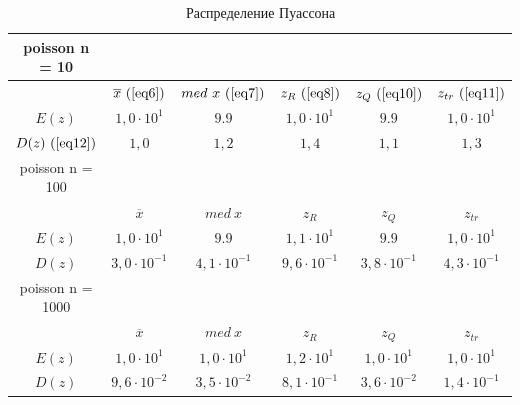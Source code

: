 \begin{table}[H]
    \centering
    \begin{tabular}{ |c|c|c|c|c|c| } 
 \hline
 poisson n = 10 & & & & & \\ 
 \hline
  &$\overline{x}\ (\ref{eq6})$ & $med\ x\ (\ref{eq7})$ & $z_{R}\ (\ref{eq8})$ & $z_{Q}\ (\ref{eq10})$ & $z_{tr}\ (\ref{eq11})$\\ 
 \hline
 $E(z)$ & $1,0 \cdot 10^{1}$ & $9.9$ & $1,0 \cdot 10^{1}$ & $9.9$ & $1,0 \cdot 10^{1}$ \\ 
 \hline
 $D(z)\ (\ref{eq12})$ & $1,0$ & $1,2$ & $1,4$ & $1,1$ & $1,3$ \\ 
 \hline\hline
 poisson n = 100 & & & & & \\
 \hline
 &$\overline{x}$ & $med\ x$ & $z_{R}$ & $z_{Q}$ & $z_{tr}$\\ 
 \hline
 $E(z)$ & $1,0 \cdot 10^{1}$ & $9.9$ & $1,1 \cdot 10^{1}$ & $9.9$ & $1,0 \cdot 10^{1}$ \\ 
 \hline
 $D(z)$ & $3,0 \cdot 10^{-1}$ & $4,1 \cdot 10^{-1}$ & $9,6 \cdot 10^{-1}$ & $3,8 \cdot 10^{-1}$ & $4,3 \cdot 10^{-1}$ \\ 
 \hline\hline
 poisson n = 1000 & & & & & \\
 \hline
 &$\overline{x}$ & $med\ x$ & $z_{R}$ & $z_{Q}$ & $z_{tr}$\\ 
 \hline
 $E(z)$ & $1,0 \cdot 10^{1}$ & $1,0 \cdot 10^{1}$ & $1,2 \cdot 10^{1}$ & $1,0 \cdot 10^{1}$ & $1,0 \cdot 10^{1}$ \\ 
 \hline
 $D(z)$ & $9,6 \cdot 10^{-2}$ & $3,5 \cdot 10^{-2}$ & $8,1 \cdot 10^{-1}$ & $3,6 \cdot 10^{-2}$ & $1,4 \cdot 10^{-1}$ \\
 \hline
\end{tabular}
    \caption{Распределение Пуассона}
    \label{table:4}
\end{table}


